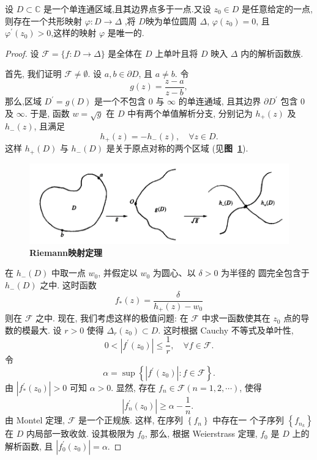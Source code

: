 \begin{thm}\label{thm: Riemann map theorem}
    设 $D\subset \mathbb
    {C}$ 是一个单连通区域,且其边界点多于一点.又设 $z_0\in D$ 是任意给定的一点,则存在一个共形映射 $\varphi : D\to \Delta$ ,将 $D$映为单位圆周 $\Delta$, $\varphi(z_0)=0$,
    且 $\varphi^\prime (z_0)>0$,这样的映射 $\varphi$ 是唯一的.
\end{thm}
\begin{proof}
    设 $\mathscr{F}=\{f\colon D\to \Delta\}$ 是全体在 $D$ 上单叶且将 $D$ 映入 $\Delta$ 内的解析函数族.

    首先, 我们证明 $\mathscr{F}\neq \emptyset$. 设 $a,b\in \partial D$, 且 $a\neq b$. 令
    $$
g(z)=\frac{z-a}{z-b},
$$
那么,区域 $D^{\prime}=g(D)$ 是一个不包含 0 与 $\infty$ 的单连通域, 且其边界 $\partial D^{\prime}$ 包含 0 及 $\infty$. 于是, 函数 $w=\sqrt{g}$ 在 $D$ 中有两个单值解析分支, 分别记为 $h_{+}(z)$ 及 $h_{-}(z)$, 且满足
$$
h_{+}(z)=-h_{-}(z), \quad \forall z \in D .
$$
这样 $h_{+}(D)$ 与 $h_{-}(D)$ 是关于原点对称的两个区域 (见\textbf{图~\ref{fig:riemann mappings}}).
\begin{figure}[ht]
    \centering
    \includegraphics{figures/riemann mapping thm.png}
    \caption{\textbf{Riemann映射定理}}
    \label{fig:riemann mappings}
\end{figure}
在 $h_{-}(D)$ 中取一点 $w_0$, 并假定以 $w_0$ 为圆心、以 $\delta>0$ 为半径的 圆完全包含于 $h_{-}(D)$ 之中. 这时函数
$$
f_*(z)=\frac{\delta}{h_{+}(z)-w_0}
$$
则在 $\mathscr{F}$ 之中.
现在, 我们考虑这样的极值问题: 在 $\mathscr{F}$ 中求一函数使其在 $z_0$ 点的导数的模最大.
设 $r>0$ 使得 $\Delta_r\left(z_0\right) \subset D$. 这时根据 Cauchy 不等式及单叶性,
$$
0<\left|f^{\prime}\left(z_0\right)\right| \leqslant \frac{1}{r}, \quad \forall f \in \mathscr{F} .
$$
令
$$
\alpha=\sup \left\{\left|f^{\prime}\left(z_0\right)\right|: f \in \mathscr{F}\right\} .
$$
由 $\left|f_*^{\prime}\left(z_0\right)\right|>0$ 可知 $\alpha>0$. 显然, 存在 $f_n \in \mathscr{F}(n=1,2, \cdots)$, 使得
$$
\left|f_n^{\prime}\left(z_0\right)\right| \geqslant \alpha-\frac{1}{n} \text {. }
$$
由 Montel 定理, $\mathscr{F}$ 是一个正规族. 这样, 在序列 $\left\{f_n\right\}$ 中存在一 个子序列 $\left\{f_{n_k}\right\}$ 在 $D$ 内局部一致收敛. 设其极限为 $f_0$, 那么, 根据
Weierstrass 定理, $f_0$ 是 $D$ 上的解析函数, 且 $\left|f_0^{\prime}\left(z_0\right)\right|=\alpha$.


\end{proof}
